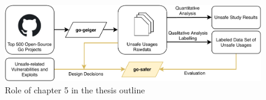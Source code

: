 \begin{figure}[htp!]
    \includegraphics[width=\textwidth]{assets/figures/chapter5/outline5.pdf}
    \caption{Role of chapter 5 in the thesis outline}
    \label{fig:outline5}
\end{figure}
